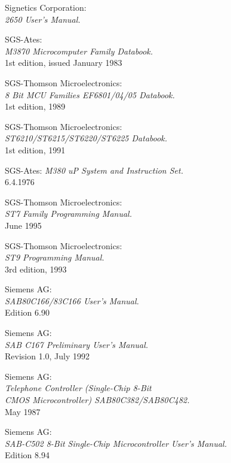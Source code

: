  Signetics Corporation: \\
                 {\em 2650 User's Manual.}

 SGS-Ates: \\
                 {\em M3870 Microcomputer Family Databook.\/}\\
                 1st edition, issued January 1983

 SGS-Thomson Microelectronics: \\
                {\em 8 Bit MCU Families EF6801/04/05 Databook.\/}\\
                1st edition, 1989

 SGS-Thomson Microelectronics: \\
                {\em ST6210/ST6215/ST6220/ST6225 Databook.\/} \\
                1st edition, 1991

 SGS-Ates:
                {\em M380 uP System and Instruction Set.\/} \\
                6.4.1976

 SGS-Thomson Microelectronics: \\
                 {\em ST7 Family Programming Manual.\/} \\
                 June 1995

 SGS-Thomson Microelectronics: \\
               {\em ST9 Programming Manual.\/} \\
               3rd edition, 1993

 Siemens AG: \\
                  {\em SAB80C166/83C166 User's Manual.\/} \\
                  Edition 6.90

 Siemens AG: \\
                  {\em SAB C167 Preliminary User's Manual.\/} \\
                  Revision 1.0, July 1992

 Siemens AG: \\
                  {\em Telephone Controller (Single-Chip 8-Bit \\
                  CMOS Microcontroller) SAB80C382/SAB80C482.\/}\\
                  May 1987

 Siemens AG: \\
                  {\em SAB-C502 8-Bit Single-Chip Microcontroller User's
                   Manual.\/} \\
                  Edition 8.94

